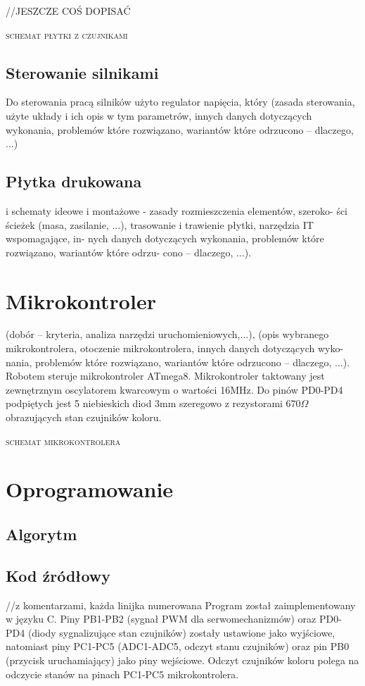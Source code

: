 \documentclass[11pt,a4paper]{article}
\begin{document}
  //JESZCZE COŚ DOPISAĆ
  
  \textsc{schemat płytki z czujnikami}

\subsection{Sterowanie silnikami}
Do sterowania pracą silników użyto regulator napięcia, który
(zasada sterowania, użyte układy i ich opis w tym parametrów, innych danych dotyczących
wykonania, problemów które rozwiązano, wariantów które odrzucono – dlaczego, ...)

\subsection{Płytka drukowana} i schematy ideowe i montażowe - zasady rozmieszczenia elementów, szeroko-
ści ścieżek (masa, zasilanie, ...), trasowanie i trawienie płytki, narzędzia IT wspomagające, in-
nych danych dotyczących wykonania, problemów które rozwiązano, wariantów które odrzu-
cono – dlaczego, ...).

\section{Mikrokontroler}
(dobór – kryteria, analiza narzędzi uruchomieniowych,...), (opis
wybranego mikrokontrolera, otoczenie mikrokontrolera, innych danych dotyczących wyko-
nania, problemów które rozwiązano, wariantów które odrzucono – dlaczego, ...).
  Robotem steruje mikrokontroler ATmega8.
  Mikrokontroler taktowany jest zewnętrznym oscylatorem kwarcowym o wartości 16MHz. Do pinów PD0-PD4 podpiętych jest 5 niebieskich diod 3mm szeregowo z rezystorami 670$\Omega$ obrazujących stan czujników koloru.
  
  \textsc{schemat mikrokontrolera}

\section{Oprogramowanie}
  \subsection{Algorytm}
  \subsection{Kod źródłowy}
//z komentarzami, każda linijka numerowana
  Program został zaimplementowany w języku C. Piny PB1-PB2 (sygnał PWM dla serwomechanizmów) oraz PD0-PD4 (diody sygnalizujące stan czujników) zostały ustawione jako wyjściowe, natomiast piny PC1-PC5 (ADC1-ADC5, odczyt stanu czujników) oraz pin PB0 (przycisk uruchamiający) jako piny wejściowe. Odczyt czujników koloru polega na odczycie stanów na pinach PC1-PC5 mikrokontrolera.
\end{document}
